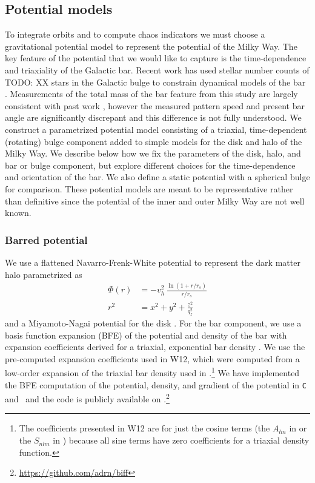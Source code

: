 \documentclass[letterpaper,12pt,preprint]{aastex}
\newcommand{\todo}[1]{{\color{red} TODO: #1}}
\begin{document}
\subsection{Potential models}\label{sec:potential}

To integrate orbits and to compute chaos indicators we must choose a gravitational potential model to represent the potential of the Milky Way. The key feature of the potential that we would like to capture is the time-dependence and triaxiality of the Galactic bar. Recent work has used stellar number counts of \todo{XX} stars in the Galactic bulge to constrain dynamical models of the bar \citep{portail15}. Measurements of the total mass of the bar feature from this study are largely consistent with past work \citep[e.g.,][]{XX}, however the measured pattern speed and present bar angle are significantly discrepant and this difference is not fully understood. We construct a parametrized potential model consisting of a triaxial, time-dependent (rotating) bulge component added to simple models for the disk and halo of the Milky Way. We describe below how we fix the parameters of the disk, halo, and bar or bulge component, but explore different choices for the time-dependence and orientation of the bar. We also define a static potential with a spherical bulge for comparison. These potential models are meant to be representative rather than definitive since the potential of the inner and outer Milky Way are not well known. 

\subsubsection{Barred potential}
We use a flattened Navarro-Frenk-White potential to represent the dark matter halo \citep[e.g.,][]{kuepper15} parametrized as
\begin{align}
	\Phi(r) &= -v_h^2\,\frac{\ln{(1 + r/r_s)}}{r/r_s}\label{eq:flatnfw}\\
	r^2 &= x^2 + y^2 + \frac{z^2}{q_z^2}
\end{align}
and a Miyamoto-Nagai potential for the disk \citep{miyamoto75}. For the bar component, we use a basis function expansion (BFE) of the potential and density of the bar with expansion coefficients derived for a triaxial, exponential bar density \citep[][hereafter W12]{wang12}. We use the pre-computed expansion coefficients used in W12, which were computed from a low-order expansion of the triaxial bar density used in \citet{dwek95}.\footnote{The coefficients presented in W12 are for just the cosine terms (the $A_{lm}$ in \citet{hernquist92} or the $S_{nlm}$ in \citet{lowing11}) because all sine terms have zero coefficients for a triaxial density function.} We have implemented the BFE computation of the potential, density, and gradient of the potential in \texttt{C} and \python\ and the code is publicly available on \github.\footnote{\url{https://github.com/adrn/biff}} 
\end{document}
